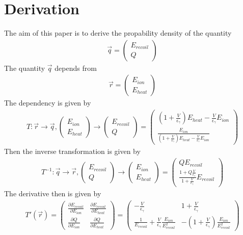 \section{Derivation}
The aim of this paper is to derive the propability density of the quantity
\begin{gather}
\vec{q} = \begin{pmatrix} E_{recoil} \\ Q \end{pmatrix}
\end{gather}
The quantity $\vec{q}$ depends from 
\begin{gather}
\vec{r} = \begin{pmatrix} E_{ion} \\ E_{heat} \end{pmatrix}
\end{gather}
The dependency is given by
\begin{gather}
T: \vec{r} \rightarrow \vec{q} , \begin{pmatrix} E_{ion} \\ E_{heat} \end{pmatrix}  \rightarrow \begin{pmatrix} E_{recoil} \\ Q \end{pmatrix} = \begin{pmatrix} \left( 1 + \frac{V}{\epsilon_\gamma} \right) E_{heat} - \frac{V}{\epsilon_\gamma} E_{ion} \\ \frac{E_{ion}}{\left( 1 + \frac{V}{\epsilon_\gamma} \right) E_{heat} - \frac{V}{\epsilon_\gamma} E_{ion}} \end{pmatrix}
\end{gather}
Then the inverse transformation is given by
\begin{gather}
T^{-1}: \vec{q} \rightarrow \vec{r}, \begin{pmatrix} E_{recoil} \\ Q \end{pmatrix} \rightarrow \begin{pmatrix} E_{ion} \\ E_{heat} \end{pmatrix} = \begin{pmatrix} Q E_{recoil} \\ \frac{1 + Q \frac{V}{\epsilon_\gamma}}{1 + \frac{V}{\epsilon_\gamma}} E_{recoil} \end{pmatrix}
\end{gather}
The derivative then is given by
\begin{gather}
T'(\vec{r}) = \begin{pmatrix} \frac{\partial E_{recoil}}{\partial E_{ion}} & \frac{\partial E_{recoil}}{\partial E_{heat}} \\ \frac{\partial Q}{\partial E_{ion}} & \frac{\partial Q}{\partial E_{heat}} \end{pmatrix}
= \begin{pmatrix} - \frac{V}{\epsilon_\gamma} & 1 + \frac{V}{\epsilon_\gamma} \\ \frac{1}{E_{recoil}} + \frac{V}{\epsilon_\gamma} \frac{E_{ion}}{E_{recoil}^2} & - \left( 1 + \frac{V}{\epsilon_\gamma} \right) \frac{E_{ion}}{E_{recoil}^2} \end{pmatrix}
\end{gather}
